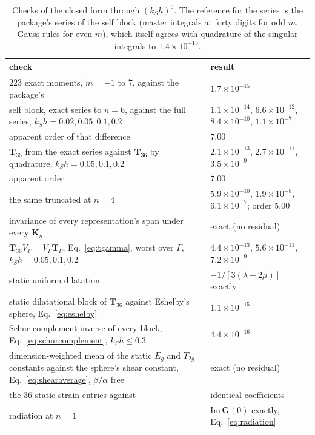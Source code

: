 \documentclass[11pt,a4paper]{article}
\newcommand{\bK}{\mathbf{K}}
\newcommand{\bG}{\mathbf{G}}
\newcommand{\bT}{\mathbf{T}}
\begin{document}
\begin{table}[htbp]
\centering
\caption{Checks of the closed form through $(k_Sh)^6$. The reference for the series is the package's
series of the self block (master integrals at forty digits for odd $m$, Gauss rules for even $m$), which
itself agrees with quadrature of the singular integrals to $1.4\times10^{-15}$.}\label{tab:checks}
\small
\begin{tabular}{@{}p{8.6cm}l@{}}
\toprule
check & result \\
\midrule
$223$ exact moments, $m=-1$ to $7$, against the package's & $1.7\times10^{-15}$ \\
self block, exact series to $n=6$, against the full series, $k_Sh=0.02,0.05,0.1,0.2$ &
$1.1\times10^{-14}$, $6.6\times10^{-12}$, $8.4\times10^{-10}$, $1.1\times10^{-7}$ \\
\quad apparent order of that difference & $7.00$ \\
$\bT_{36}$ from the exact series against $\bT_{36}$ by quadrature, $k_Sh=0.05,0.1,0.2$ &
$2.1\times10^{-13}$, $2.7\times10^{-11}$, $3.5\times10^{-9}$ \\
\quad apparent order & $7.00$ \\
\quad the same truncated at $n=4$ & $5.9\times10^{-10}$, $1.9\times10^{-8}$, $6.1\times10^{-7}$; order $5.00$ \\
invariance of every representation's span under every $\bK_n$ & exact (no residual) \\
$\bT_{36}V_\Gamma=V_\Gamma\bT_\Gamma$, Eq.~\eqref{eq:tgamma}, worst over $\Gamma$, $k_Sh=0.05,0.1,0.2$ &
$4.4\times10^{-13}$, $5.6\times10^{-11}$, $7.2\times10^{-9}$ \\
static uniform dilatation & $-1/[3(\lambda+2\mu)]$ exactly \\
static dilatational block of $\bT_{36}$ against Eshelby's sphere, Eq.~\eqref{eq:eshelby} & $1.1\times10^{-15}$ \\
Schur-complement inverse of every block, Eq.~\eqref{eq:schurcomplement}, $k_Sh\le0.3$ & $4.4\times10^{-16}$ \\
dimension-weighted mean of the static $E_g$ and $T_{2g}$ constants against the sphere's shear constant,
Eq.~\eqref{eq:shearaverage}, $\beta/\alpha$ free & exact (no residual) \\
the $36$ static strain entries against \citet{NestorCoupling2026} & identical coefficients \\
radiation at $n=1$ & $\mathrm{Im}\,\bG(0)$ exactly, Eq.~\eqref{eq:radiation} \\
\bottomrule
\end{tabular}
\end{table}
\end{document}
